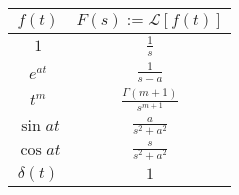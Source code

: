 \documentclass[UTF8, 12pt]{ctexart}
\begin{document}
	\begin{table}[ht]
		\begin{tabular}{|c|c|}
			\hline
			$ f(t)$ & $ F(s) := \mathscr{L}[f(t)]$ \\ \hline
			$ 1 $ & $ \frac{1}{s} $ \\ \hline
			$ e^{at} $ & $ \frac{1}{s-a} $ \\ \hline
			$ t^{m} $ & $ \frac{\Gamma(m+1)}{s^{m+1}} $ \\ \hline
			$ \sin at $ & $ \frac{a}{s^{2}+a^{2}} $ \\ \hline
			$ \cos at $ & $ \frac{s}{s^{2}+a^{2}} $ \\ \hline
			$ \delta(t) $ & $ 1 $ \\ \hline
		\end{tabular}
	\end{table}
\end{document}
